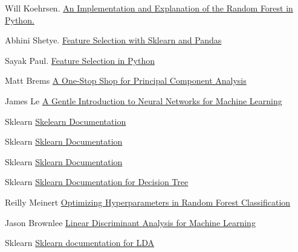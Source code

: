 \documentclass{article}
\begin{document}
\begin{thebibliography}{1}

Will Koehrsen.
\newblock\href{https://towardsdatascience.com/an-implementation-and-explanation-of-the-random-forest-in-python-77bf308a9b76}{ An Implementation and Explanation of the Random Forest in Python.}

Abhini Shetye.
\newblock\href{https://towardsdatascience.com/feature-selection-with-pandas-e3690ad8504b}{Feature Selection with Sklearn and Pandas}

Sayak Paul.
\newblock\href{https://www.datacamp.com/community/tutorials/feature-selection-python}{Feature Selection in Python}

Matt Brems
\newblock\href{https://towardsdatascience.com/a-one-stop-shop-for-principal-component-analysis-5582fb7e0a9c}{A One-Stop Shop for Principal Component Analysis}

James Le
\newblock\href{https://www.codementor.io/@james_aka_yale/a-gentle-introduction-to-neural-networks-for-machine-learning-hkijvz7lp}{A Gentle Introduction to Neural Networks for Machine Learning}

Sklearn
\newblock\href{https://scikit-learn.org/stable/modules/generated/sklearn.linear_model.LogisticRegression.html}{Skelearn Documentation}

Sklearn
\newblock\href{https://scikit-learn.org/0.16/modules/generated/sklearn.qda.QDA.html}{Sklearn Documentation}

Sklearn
\newblock\href{https://scikit-learn.org/stable/modules/generated/sklearn.feature_selection.SelectKBest.html}{Sklearn Documentation}

Sklearn
\newblock\href{https://scikit-learn.org/stable/auto_examples/tree/plot_tree_regression.html}{Sklearn Documentation for Decision Tree}

Reilly Meinert
\newblock\href{https://towardsdatascience.com/optimizing-hyperparameters-in-random-forest-classification-ec7741f9d3f6}{Optimizing Hyperparameters in Random Forest Classification}

Jason Brownlee
\newblock\href{https://machinelearningmastery.com/linear-discriminant-analysis-for-machine-learning/}{Linear Discriminant Analysis for Machine Learning}

Sklearn
\newblock\href{https://scikit-learn.org/stable/modules/generated/sklearn.discriminant_analysis.LinearDiscriminantAnalysis.html}{Sklearn documentation for LDA}


\end{thebibliography}
\end{document}

